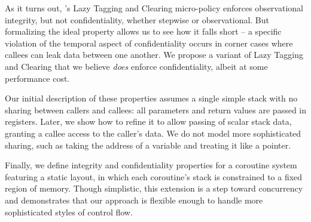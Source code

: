 \documentclass[acmsmall,review,anonymous]{acmart}\settopmatter{printfolios=true,printccs=false,printacmref=false}
\begin{document}
As it turns out, \citeauthor{DBLP:conf/sp/RoesslerD18}'s Lazy Tagging and
Clearing micro-policy enforces observational integrity, but not confidentiality,
whether stepwise or observational.
But formalizing the ideal property allows us to see how it falls short -- a specific
violation of the temporal aspect of confidentiality occurs in corner cases where callees
can leak data between one another.
We propose  a variant of Lazy Tagging and Clearing that we believe \emph{does} enforce
confidentiality, albeit at some performance cost.

Our initial description of these properties assumes a single simple stack with no sharing
between callers and callees: all parameters and return values are passed in registers.  Later,
we show how to refine it to allow passing of scalar stack data, granting a
callee access to the caller's data. We do not model more sophisticated sharing,
such as taking the address of a variable and treating it like a pointer.

Finally, we define integrity and confidentiality properties for a coroutine system featuring
a static layout, in which each coroutine's stack is constrained to a fixed region of memory.
Though simplistic, this extension is a step toward concurrency and demonstrates that
our approach is flexible enough to handle more sophisticated styles of
control flow.


\end{document}
